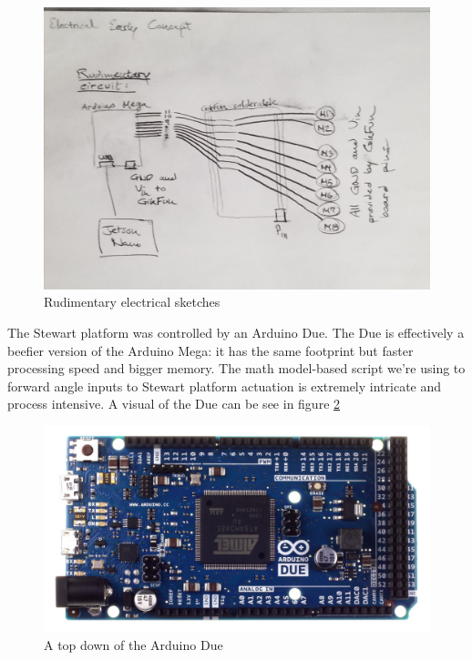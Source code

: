 \documentclass[a4paper, 10pt]{article}
\begin{document}
 		\begin{figure} [h]
			\centering
			\includegraphics[scale=0.2]{Photos/early_electrical}
			\caption{Rudimentary electrical sketches}
			\label{basic_electrical}
		\end{figure}

 		The Stewart platform was controlled by an Arduino Due. The Due is effectively a beefier version of the Arduino Mega: it has the same footprint but faster processing speed and bigger memory. The math model-based script we're using to forward angle inputs to Stewart platform actuation is extremely intricate and process intensive. A visual of the Due can be see in figure \ref{arduino_due}
 		
 		\begin{figure} [h]
			\centering
			\includegraphics[scale=0.2]{Photos/arduino_due}
			\caption{A top down of the Arduino Due}
			\label{arduino_due}
		\end{figure}
 
\end{document}
